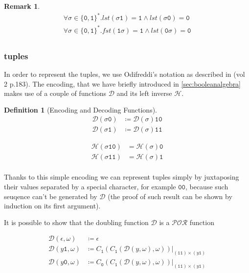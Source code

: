 \documentclass[10pt]{amsart}
\newcommand{\POR}{\mathcal{POR}}
\newcommand{\zero}{\mathtt{0}}
\newcommand{\one}{\mathtt{1}}
\newcommand{\vtwo}{y}
\newcommand{\oone}{\omega}
\newcommand{\db}{\mathcal D}
\newcommand{\hv}{\mathcal H}
\newtheorem{defn}{Definition}
\newtheorem{remark}{Remark}
\begin{document}
\begin{remark}
\[
\begin{gathered}
\forall \sigma \in \{\zero, \one\}^*. lst(\sigma \one)=\one \land lst(\sigma \zero)=\zero\\
\forall \sigma \in \{\zero, \one\}^*. fst(\one\sigma)=\one \land lst(\zero\sigma)=\zero\\
\end{gathered}
\]
\end{remark}

\subsubsection{tuples}

In order to represent the tuples, we use Odifreddi's notation as described in (vol 2 p.183). The encoding, that we have briefly introduced in \ref{sec:booleanalgebra} makes use of a couple of functions $\db$ and its left inverse $\hv$.

\begin{defn}[Encoding and Decoding Functions]

\begin{align*}
\db(\sigma\zero) &\coloneqq \db(\sigma)\one\zero\\
\db(\sigma\one) &\coloneqq  \db(\sigma)\one\one
\end{align*}


\begin{align*}
\hv (\sigma \one\zero)&=\hv(\sigma)\zero\\
\hv (\sigma \one\one)&=\hv(\sigma)\one\\
\end{align*}
\end{defn}

Thanks to this simple encoding we can represent tuples simply by juxtaposing their values separated by a special character, for example $\zero\zero$, because such seuqence can't be generated by $\db$ (the proof of such result can be shown by induction on its first argument).

It is possible to show that the doubling function $\db$ is a $\POR$ function

\begin{align*}
\db(\epsilon, \oone)&\coloneqq \epsilon\\
\db(\vtwo\one, \oone)&\coloneqq C_\one(C_\one(\db(\vtwo, \oone), \oone))|_{(\one\one)\times(\vtwo \one)}\\
\db(\vtwo\zero, \oone)&\coloneqq C_\zero(C_\one(\db(\vtwo, \oone), \oone))|_{(\one\one)\times(\vtwo \one)}\\
\end{align*}
\end{document}
